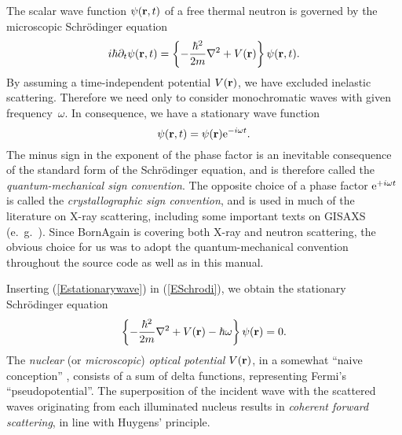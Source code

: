 The scalar wave function $\psi(\mathbf{r},t)$ of a free thermal neutron
is governed by the microscopic Schrödinger equation
\begin{equation}\label{ESchrodi}
  i\hbar\partial_t \psi(\mathbf{r},t)
  = \left\{-\frac{\hbar^2}{2m}\mathbf{\nabla}^2+V(\mathbf{r})\right\} \psi(\mathbf{r},t).
\end{equation}
By assuming a time-independent potential $V(\mathbf{r})$,
we have excluded inelastic scattering.
Therefore we need only to consider monochromatic waves
with given frequency~$\omega$.
In consequence, we have a stationary wave function
\begin{equation}\label{Estationarywave}
  \psi(\mathbf{r},t) = \psi(\mathbf{r}){\rm e}^{-i\omega t}.
\end{equation}
The minus sign in the exponent of the phase factor
is an inevitable consequence of the standard form of the Schrödinger equation,
and is therefore called the \textit{quantum-mechanical sign convention}.
The opposite choice of a phase factor ${\rm e}^{+i\omega t}$ is 
called the \textit{crystallographic sign convention},
and is used in much of the literature on X-ray scattering,
including some important texts on GISAXS (e.~g.\ \cite{ReLL09}).
Since BornAgain is covering both X-ray and neutron scattering,
the obvious choice for us was to adopt the quantum-mechanical convention
throughout the source code as well as in this manual.

Inserting (\ref{Estationarywave}) in (\ref{ESchrodi}),
we obtain the stationary Schrödinger equation
\begin{equation}\label{EstatSchrodi}
  \left\{-\frac{\hbar^2}{2m}\mathbf{\nabla}^2+V(\mathbf{r})-\hbar\omega\right\} \psi(\mathbf{r}) = 0.
\end{equation}
The \textit{nuclear} (or \textit{microscopic})
\textit{optical potential} $V(\mathbf{r})$,
in a somewhat ``naive conception'' \cite[p.~7]{Sea89},
consists of a sum of delta functions,
representing Fermi's ``pseudopotential''.
The superposition of the incident wave with the scattered waves
originating from each illuminated nucleus
results in \textit{coherent forward scattering},%
in line with Huygens' principle.%

